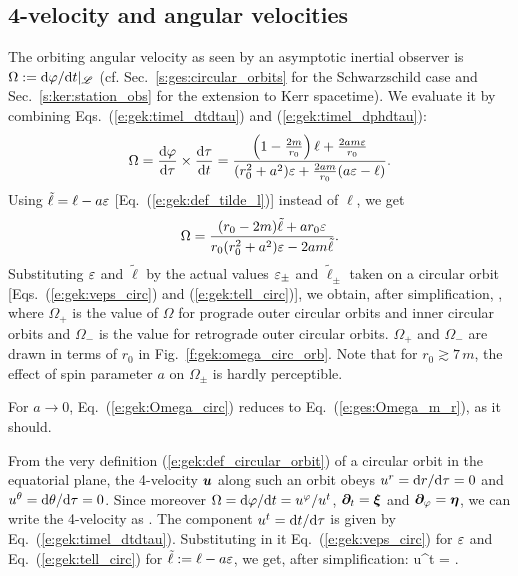 \subsection{4-velocity and angular velocities} \label{s:gek:circ_velocities}

The orbiting angular velocity as seen by an asymptotic inertial observer is
$\Omega := \mathrm{d}\varphi/\mathrm{d} t |_{\mathscr{L}}$ (cf. Sec.~\ref{s:ges:circular_orbits} for the
Schwarzschild case and Sec.~\ref{s:ker:station_obs} for the extension to Kerr
spacetime).
We evaluate it by combining Eqs.~(\ref{e:gek:timel_dtdtau}) and (\ref{e:gek:timel_dphdtau}):
\[
    \Omega = \frac{\mathrm{d}\varphi}{\mathrm{d}\tau} \times \frac{\mathrm{d}\tau}{\mathrm{d} t}
        = \frac{ \left( 1 - \frac{2m}{r_0} \right) \ell
    + \frac{2 am \varepsilon}{r_0} }{(r_0^2 + a^2) \varepsilon + \frac{2 a m}{r_0} (a\varepsilon - \ell)} .
\]
Using $\tilde{\ell} = \ell - a\varepsilon$ [Eq.~(\ref{e:gek:def_tilde_l})] instead of $\ell$, we
get
\[
    \Omega = \frac{(r_0 - 2m) \tilde{\ell} + a r_0 \varepsilon}{r_0(r_0^2 + a^2) \varepsilon
    - 2 a m \tilde{\ell}} .
\]
Substituting $\varepsilon$ and $\tilde{\ell}$ by the actual values $\varepsilon_\pm$
and $\tilde{\ell}_\pm$ taken on a circular orbit [Eqs.~(\ref{e:gek:veps_circ})
and (\ref{e:gek:tell_circ})], we obtain, after simplification,
\be \label{e:gek:Omega_circ}
     ,
\ee
where $\Omega_+$ is the value of $\Omega$ for prograde outer circular orbits
and inner circular orbits and $\Omega_-$ is the value for retrograde
outer circular orbits. $\Omega_+$ and $\Omega_-$ are drawn in terms of $r_0$
in Fig.~\ref{f:gek:omega_circ_orb}. Note that for $r_0 \gtrsim 7\, m$,
the effect of spin parameter $a$ on $\Omega_\pm$ is hardly perceptible.

\begin{remark}
For $a\to 0$, Eq.~(\ref{e:gek:Omega_circ}) reduces to Eq.~(\ref{e:ges:Omega_m_r}), as it should.
\end{remark}

From the very definition (\ref{e:gek:def_circular_orbit}) of a circular orbit
in the equatorial plane, the 4-velocity $\bm{u}$ along such an orbit
obeys $u^r = \mathrm{d} r/\mathrm{d}\tau = 0$ and $u^\theta = \mathrm{d}\theta/\mathrm{d}\tau = 0$. Since moreover
$\Omega = \mathrm{d}\varphi/\mathrm{d} t = u^\varphi / u^t$, $\bm{\partial}_t = \bm{\xi}$ and $\bm{\partial}_\varphi = \bm{\eta}$,
we can write the 4-velocity as
\be \label{e:gek:4vel_circ_orb}
     .
\ee
The component $u^t = \mathrm{d} t / \mathrm{d}\tau$ is given by Eq.~(\ref{e:gek:timel_dtdtau}).
Substituting in it Eq.~(\ref{e:gek:veps_circ}) for $\varepsilon$
and Eq.~(\ref{e:gek:tell_circ}) for $\tilde{\ell} := \ell - a \varepsilon$, we
get, after simplification:
\be \label{e:gek:ut_circ_orb}
    u^t =  .
\ee


